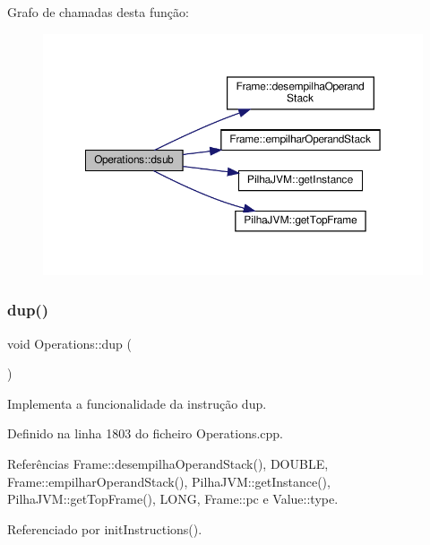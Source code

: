 Grafo de chamadas desta função\+:\nopagebreak
\begin{figure}[H]
\begin{center}
\leavevmode
\includegraphics[width=350pt]{classOperations_aa994b0cf4aead2646fa5bb90c2643664_cgraph}
\end{center}
\end{figure}
\mbox{\label{classOperations_a0cba4ff895f2e3908eea5b39305481a4}} 
\subsubsection{\texorpdfstring{dup()}{dup()}}
{\footnotesize\ttfamily void Operations\+::dup (\begin{DoxyParamCaption}{ }\end{DoxyParamCaption})\hspace{0.3cm}{\ttfamily [private]}}



Implementa a funcionalidade da instrução dup. 



Definido na linha 1803 do ficheiro Operations.\+cpp.



Referências Frame\+::desempilha\+Operand\+Stack(), D\+O\+U\+B\+LE, Frame\+::empilhar\+Operand\+Stack(), Pilha\+J\+V\+M\+::get\+Instance(), Pilha\+J\+V\+M\+::get\+Top\+Frame(), L\+O\+NG, Frame\+::pc e Value\+::type.



Referenciado por init\+Instructions().

